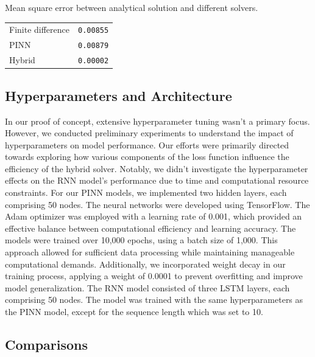 \documentclass[twoside,11pt]{report}
\begin{document}
    \begin{mytable}[float=!h,label=tab:toyscores, width=0.5\textwidth]{Mean square error between 
        analytical solution and different solvers.}
    \centering
    \begin{tabular}{l|l}
        Finite difference   &\texttt{0.00855}  \\
        PINN                &\texttt{0.00879}  \\
        Hybrid              &\texttt{0.00002}  \\
    \end{tabular}%
    \end{mytable}

\subsection{Hyperparameters and Architecture}
\label{sec:hyperparameters}

    In our proof of concept, extensive hyperparameter tuning wasn't a primary focus. 
    However, we conducted preliminary experiments to understand the impact of hyperparameters 
    on model performance. Our efforts were primarily directed towards exploring how various 
    components of the loss function influence the efficiency of the hybrid solver. Notably, 
    we didn't investigate the hyperparameter effects on the RNN model's performance due to time 
    and computational resource constraints.
    For our PINN models, we implemented two hidden layers, each comprising 50 nodes. The neural 
    networks were developed using TensorFlow\cite{tensorflow2015-whitepaper}. The Adam optimizer was 
    employed with a learning 
    rate of 0.001, which provided an effective balance between computational efficiency and learning accuracy. 
    The models were trained over 10,000 epochs, using a batch size of 1,000. This approach allowed for 
    sufficient data processing while maintaining manageable computational demands. Additionally, 
    we incorporated weight decay in our training process, applying a weight of 0.0001 to prevent 
    overfitting and improve model generalization.
    The RNN model consisted of three LSTM layers, each comprising 50 nodes. The model was trained
    with the same hyperparameters as the PINN model, except for the sequence length which was set to 10.


\subsection{Comparisons}
\label{sec:comparisons}
\end{document}
